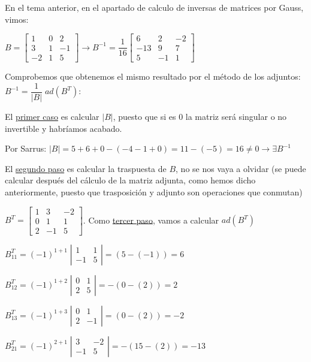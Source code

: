 \begin{ejem}
	En el tema anterior, en el apartado de calculo de inversas de matrices por Gauss, vimos:
	
	$B=\left[\begin{matrix} 1&0&2\\3&1&-1\\-2&1&5  \end{matrix}\right] \to B^{-1}=
\dfrac 1 {16} \left[ \begin{matrix} 6&2&-2 \\ -13&9&7 \\5&-1&1  \end{matrix} \right]$

Comprobemos que obtenemos el mismo resultado por el método de los adjuntos:  $B^{-1}=\dfrac 1 {|B|}\; ad(B^T)$:

El \underline{primer caso} es calcular $|B|$, puesto que si es $0$ la matriz será singular o no invertible y habríamos acabado.

Por Sarrus: $|B|=5+6+0-(-4-1+0)=11-(-5)=16\neq 0 \to \exists B^{-1}$

El \underline{segundo paso} es calcular la traspuesta de $B$, no se nos vaya a olvidar \textcolor{gris}{(se puede calcular después del cálculo de la matriz adjunta, como hemos dicho anteriormente, puesto que trasposición y adjunto son operaciones que conmutan)}

$B^T=\left[\begin{matrix} 1&3&-2\\0&1&1\\2&-1&5  \end{matrix}\right]$. Como \underline{tercer paso}, vamos a calcular $ad(B^T)$


$B^T_{11}= (-1)^{1+1}\; \left| \begin{matrix} 1&1\\-1&5 \end{matrix} \right|=
(5-(-1))=6$

$B^T_{12}= (-1)^{1+2}\; \left| \begin{matrix} 0&1\\2&5 \end{matrix} \right|=
-(0-(2))=2$

$B^T_{13}= (-1)^{1+3}\; \left| \begin{matrix} 0&1\\2&-1 \end{matrix} \right|=
(0-(2))=-2$



$B^T_{21}= (-1)^{2+1}\; \left| \begin{matrix} 3&-2\\-1&5 \end{matrix} \right|=
-(15-(2))=-13$


\end{ejem}
